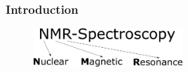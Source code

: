 \documentclass[aspectratio=169]{beamer}
\begin{document}
\begin{frame}
	\frametitle{Introduction}
	\begin{figure}
		\includegraphics[width=0.5\textwidth]{./Resources/nmr_text.png}
		\label{fig:nmr_text}
	\end{figure}
	\flushleft
	\vspace*{-15pt}
	\pause
	\hrulefill
	\vspace*{5pt}
	

\end{frame}
\end{document}
